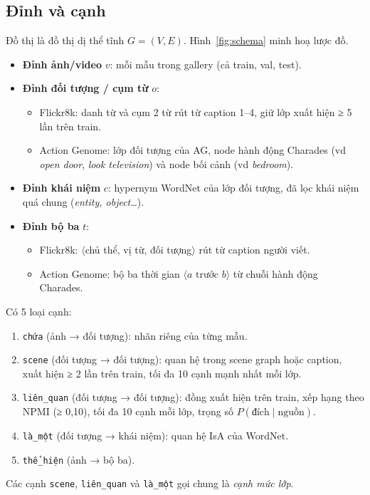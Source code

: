 \documentclass[11pt,a4paper]{article}
\begin{document}
\subsection{Đỉnh và cạnh}
Đồ thị là đồ thị dị thể tĩnh \(G=(V,E)\). Hình~\ref{fig:schema} minh hoạ lược đồ.
\begin{itemize}
  \item \textbf{Đỉnh ảnh/video} \(v\): mỗi mẫu trong gallery (cả train, val, test).
  \item \textbf{Đỉnh đối tượng / cụm từ} \(o\):
  \begin{itemize}
    \item Flickr8k: danh từ và cụm 2 từ rút từ caption 1–4, giữ lớp xuất hiện ≥ 5 lần trên train.
    \item Action Genome: lớp đối tượng của AG, node hành động Charades (vd \textit{open door}, \textit{look television}) và node bối cảnh (vd \textit{bedroom}).
  \end{itemize}
  \item \textbf{Đỉnh khái niệm} \(c\): hypernym WordNet của lớp đối tượng, đã lọc khái niệm quá chung (\textit{entity, object\ldots}).
  \item \textbf{Đỉnh bộ ba} \(t\):
  \begin{itemize}
    \item Flickr8k: \(\langle\)chủ thể, vị từ, đối tượng\(\rangle\) rút từ caption người viết.
    \item Action Genome: bộ ba thời gian \(\langle a \text{ trước } b\rangle\) từ chuỗi hành động Charades.
  \end{itemize}
\end{itemize}

Có 5 loại cạnh:
\begin{enumerate}
  \item \texttt{chứa} (ảnh → đối tượng): nhãn riêng của từng mẫu.
  \item \texttt{scene} (đối tượng → đối tượng): quan hệ trong scene graph hoặc caption, xuất hiện ≥ 2 lần trên train, tối đa 10 cạnh mạnh nhất mỗi lớp.
  \item \texttt{liên\_quan} (đối tượng → đối tượng): đồng xuất hiện trên train, xếp hạng theo NPMI (≥ 0,10), tối đa 10 cạnh mỗi lớp, trọng số \(P(\text{đích}\mid\text{nguồn})\).
  \item \texttt{là\_một} (đối tượng → khái niệm): quan hệ IsA của WordNet.
  \item \texttt{thể\_hiện} (ảnh → bộ ba).
\end{enumerate}
Các cạnh \texttt{scene}, \texttt{liên\_quan} và \texttt{là\_một} gọi chung là \emph{cạnh mức lớp}.
\end{document}
